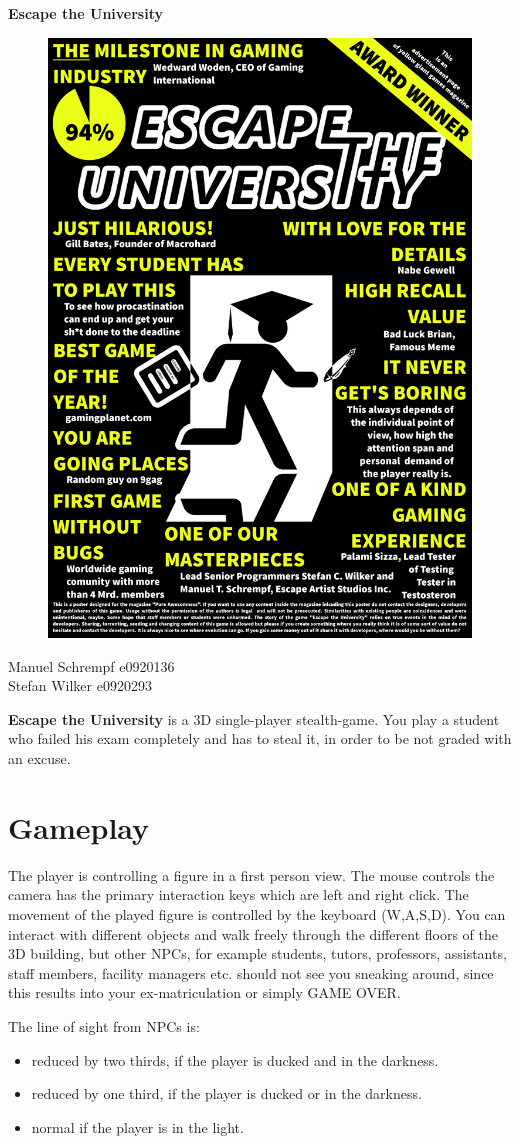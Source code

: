 \documentclass[12pt]{article}
\begin{document}
\newpage
\pagestyle{plain}
\setcounter{page}{1}

\begin{Huge}
\textbf{
Escape the University}
	
\end{Huge}


\begin{figure}[ht]
	\centering
	\includegraphics[width=0.25\linewidth]{Images/poster}
\end{figure}  



Manuel Schrempf e0920136\\
Stefan Wilker   e0920293

\textbf{Escape the University} is a 3D single-player stealth-game. You play a student who failed his exam completely and has to steal it, in order to be not graded with an excuse. 

\section*{Gameplay} 

The player is controlling a figure in a first person view. The mouse controls the camera has the primary interaction keys which are left and right click. The movement of the played figure is controlled by the keyboard (W,A,S,D). You can interact with different objects and walk freely through the different floors of the 3D building, but other NPCs, for example students, tutors, professors, assistants, staff members, facility managers etc. should not see you sneaking around, since this results into your ex-matriculation or simply GAME OVER.

The line of sight from NPCs is:

\begin{itemize}
	\item reduced by two thirds, if the player is ducked and in the darkness.
	\item reduced by one third, if the player is ducked or in the darkness.
	\item normal if the player is in the light.
\end{itemize}
\end{document}

